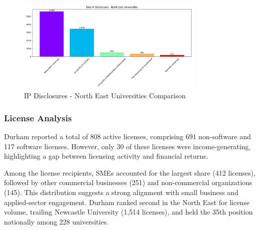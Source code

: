 \documentclass[journal,onecolumn, 10pt,draftclsnofoot]{IEEEtran}
\begin{document}
\begin{figure}[h]
\centering
\includegraphics[width=0.8\textwidth]{Fig/figure20.ip_ne_comparison.png}
\caption{IP Disclosures - North East Universities Comparison}
\label{fig:ip-ne-comparison}
\end{figure}

\subsubsection{License Analysis}

Durham reported a total of 808 active licenses, comprising 691 non-software and 117 software licenses. However, only 30 of these licenses were income-generating, highlighting a gap between licensing activity and financial returns.

Among the license recipients, SMEs accounted for the largest share (412 licenses), followed by other commercial businesses (251) and non-commercial organizations (145). This distribution suggests a strong alignment with small business and applied-sector engagement. Durham ranked second in the North East for license volume, trailing Newcastle University (1,514 licenses), and held the 35th position nationally among 228 universities.
\end{document}
